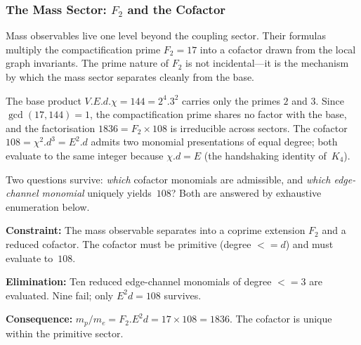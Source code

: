 \documentclass[11pt,a4paper]{book}
\def\cdot{.}%
\def\leq{<=}%
\begin{document}
\subsubsection*{The Mass Sector: $F_2$ and the Cofactor}

Mass observables live one level beyond the coupling sector.  Their
formulas multiply the compactification prime $F_2 = 17$ into a cofactor
drawn from the local graph invariants.  The prime nature of $F_2$ is
not incidental---it is the mechanism by which the mass sector separates
cleanly from the base.

The base product $V \cdot E \cdot d \cdot \chi = 144 = 2^4 \cdot 3^2$
carries only the primes $2$ and $3$.  Since $\gcd(17, 144) = 1$, the
compactification prime shares no factor with the base, and the
factorisation $1836 = F_2 \times 108$ is irreducible across sectors.
The cofactor $108 = \chi^2 \cdot d^3 = E^2 \cdot d$ admits two
monomial presentations of equal degree; both evaluate to the same
integer because $\chi \cdot d = E$ (the handshaking identity of~$K_4$).

Two questions survive: \emph{which} cofactor monomials are admissible,
and \emph{which edge-channel monomial} uniquely yields~$108$?  Both
are answered by exhaustive enumeration below.

\textbf{Constraint:}
The mass observable separates into a coprime extension $F_2$ and a
reduced cofactor.  The cofactor must be primitive (degree $\leq d$)
and must evaluate to~$108$.

\textbf{Elimination:}
Ten reduced edge-channel monomials of degree $\leq 3$ are
evaluated.  Nine fail; only $E^2 d = 108$ survives.

\textbf{Consequence:}
$m_p / m_e = F_2 \cdot E^2 d = 17 \times 108 = 1836$.  The
cofactor is unique within the primitive sector.
\end{document}
